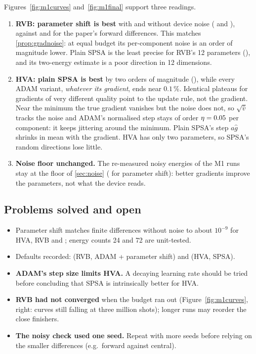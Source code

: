 Figures~\ref{fig:m1curves} and~\ref{fig:m1final} support three readings.
\begin{enumerate}
  \item \textbf{RVB: parameter shift is best} with and without device noise
    (\VMIdealRvbPs{} and \VMNoisyRvbPs{}), against \VMIdealRvbFwd{} and \VMNoisyRvbFwd{} for the
    paper's forward differences. This matches \cref{prop:gradnoise}: at equal budget its
    per-component noise is an order of magnitude lower. Plain SPSA is the least precise for RVB's
    12 parameters (\VMIdealRvbSpsa), and its two-energy estimate is a poor direction in 12
    dimensions.
  \item \textbf{HVA: plain SPSA is best} by two orders of magnitude (\VMIdealHvaSpsa), while
    every ADAM variant, \emph{whatever its gradient}, ends near $0.1\,\%$. Identical plateaus
    for gradients of very different quality point to the update rule, not the gradient. Near the
    minimum the true gradient vanishes but the noise does not, so $\sqrt{\hat v}$ tracks the noise
    and ADAM's normalised step stays of order $\eta=0.05$ per component: it keeps jittering
    around the minimum. Plain SPSA's step $a\hat g$ shrinks in mean with the gradient. HVA has
    only two parameters, so SPSA's random directions lose little.
  \item \textbf{Noise floor unchanged.} The re-measured noisy energies of the M1 runs stay at the
    floor of \cref{sec:noise} (\VMNoisyFinalRvbPs{} for parameter shift): better gradients
    improve the parameters, not what the device reads.
\end{enumerate}

\subsection{Problems solved and open}

\begin{itemize}
  \item[\checkmark] Parameter shift matches finite differences without noise to about
    $10^{-9}$ for HVA, RVB and ; energy counts 24 and 72 are unit-tested.
  \item[\checkmark] Defaults recorded:  (RVB, ADAM +
    parameter shift) and  (HVA, SPSA).
  \item[$\circ$] \textbf{ADAM's step size limits HVA.} A decaying learning rate should be tried
    before concluding that SPSA is intrinsically better for HVA.
  \item[$\circ$] \textbf{RVB had not converged} when the budget ran out
    (Figure~\ref{fig:m1curves}, right: curves still falling at three million shots); longer runs
    may reorder the close finishers.
  \item[$\circ$] \textbf{The noisy check used one seed.} Repeat with more seeds before relying on
    the smaller differences (e.g.\ forward against central).
\end{itemize}

